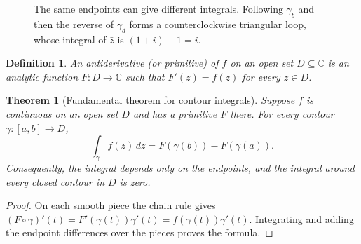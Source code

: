 \documentclass{report}
\newtheorem{theorem}{Theorem}
\newtheorem{definition}{Definition}
\begin{document}
\begin{figure}[H]
    \centering
    \caption{The same endpoints can give different integrals. Following
    $\gamma_b$ and then the reverse of $\gamma_d$ forms a counterclockwise
    triangular loop, whose integral of $\bar z$ is $(1+i)-1=i$.}
    \label{fig:integration-path-dependence}
\end{figure}

\begin{definition}
    An \emph{antiderivative} (or \emph{primitive}) of $f$ on an open set
    $D\subseteq\mathbb C$ is an analytic function $F:D\to\mathbb C$
    such that $F'(z)=f(z)$ for every $z\in D$.
\end{definition}

\begin{theorem}[Fundamental theorem for contour integrals]
    Suppose $f$ is continuous on an open set $D$ and has a primitive $F$
    there. For every contour $\gamma:[a,b]\to D$,
    \[
        \boxed{\displaystyle
        \int_\gamma f(z)\,dz=F(\gamma(b))-F(\gamma(a)).}
    \]
    Consequently, the integral depends only on the endpoints, and the
    integral around every closed contour in $D$ is zero.
\end{theorem}
\begin{proof}
    On each smooth piece the chain rule gives
    $(F\circ\gamma)'(t)=F'(\gamma(t))\gamma'(t)
    =f(\gamma(t))\gamma'(t)$. Integrating and adding the endpoint
    differences over the pieces proves the formula.
\end{proof}
\end{document}

